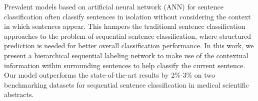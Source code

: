 Prevalent models based on artificial neural network (ANN) for sentence classification often classify sentences in isolation without considering the context in which sentences appear. This hampers the traditional sentence classification approaches to the problem of sequential sentence classification, where structured prediction is needed for better overall classification performance. In this work, we present a hierarchical sequential labeling network to make use of the contextual information within surrounding sentences to help classify the current sentence. Our model outperforms the state-of-the-art results by 2\%-3\% on two benchmarking datasets for sequential sentence classification in medical scientific abstracts.
